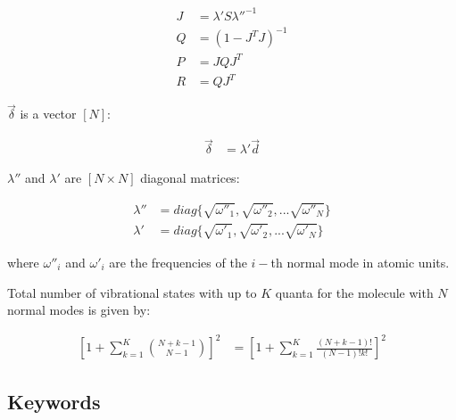 \documentclass[11pt]{article}
\begin{document}
\begin{align}
J&=\lambda' S \lambda''^{-1}\nonumber\\
Q&=(1-J^TJ)^{-1}\nonumber\\
P&=JQJ^T\nonumber\\
R&=QJ^T\nonumber
\end{align}

$\overrightarrow{\delta}$ is a vector $[N]$:

\begin{align}
\overrightarrow{\delta}&=\lambda'\overrightarrow{d}\nonumber
\end{align}

$\lambda''$ and $\lambda'$ are $[N\times N]$ diagonal matrices:

\begin{align}
\lambda''&=diag\{\sqrt{\omega''_1},\sqrt{\omega''_2},... \sqrt{\omega''_N}\}\nonumber\\
\lambda'&=diag\{\sqrt{\omega'_1},\sqrt{\omega'_2},... \sqrt{\omega'_N}\}\nonumber
\end{align}


where $\omega''_i$ and $\omega'_i$ are the frequencies of the $i-$th normal mode in atomic units.


Total number of vibrational states with up to $K$ quanta for the molecule with $N$ normal modes is
given by\cite{stars_and_bars}:

\begin{align}
\left[ 1+\sum_{k=1}^{K} {{N+k-1}\choose{N-1}} \right]^2&=\left[ 1+\sum_{k=1}^{K}\frac{(N+k-1)!}{(N-1)!k!} \right]^2
\end{align}



\subsection{Keywords}
\label{sec:dhush:keywords}
\end{document}
